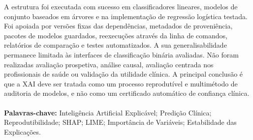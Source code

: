 A estrutura foi executada com sucesso em classificadores lineares, modelos de conjunto baseados em árvores e na implementação de regressão logística testada. Foi apoiada por versões fixas das dependências, metadados de proveniência, pacotes de modelos guardados, reexecuções através da linha de comandos, relatórios de comparação e testes automatizados. A sua generalisabilidade permanece limitada às interfaces de classificação binária avaliadas. Não foram realizadas avaliação prospetiva, análise causal, avaliação centrada nos profissionais de saúde ou validação da utilidade clínica. A principal conclusão é que a XAI deve ser tratada como um processo reprodutível e multimétodo de auditoria de modelos, e não como um certificado automático de confiança clínica.

\paragraph{}
\textbf{Palavras-chave:} Inteligência Artificial Explicável; Predição Clínica; Reprodutibilidade; SHAP; LIME; Importância de Variáveis; Estabilidade das Explicações.
